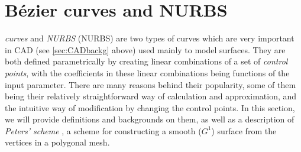 \section{B{\'e}zier curves and \acs{NURBS}}
\label{sec:NURBS}


\emph{\Bez curves} and \emph{\acl{NURBS}} (\acs{NURBS}) are two types of curves which are very important in CAD (see \autoref{sec:CADbackg} above) used mainly to model surfaces. They are both defined parametrically by creating linear combinations of a set of \emph{control points}, with the coefficients in these linear combinations being functions of the input parameter. There are many reasons behind their popularity, some of them being their relatively straightforward way of calculation and approximation, and the intuitive way of modification by changing the control points. In this section, we will provide definitions and backgrounds on them, as well as a description of \emph{Peters' scheme} \cite{peters1992constructing}, a scheme for constructing a smooth ($G^1$) surface from the vertices in a polygonal mesh.




